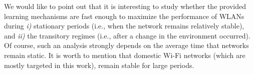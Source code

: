 \documentclass[a4paper,twoside,11pt]{reviewresponse}
\begin{document}
	We would like to point out that it is interesting to study whether the provided learning mechanisms are fast enough to maximize the performance of WLANs during \emph{i)} stationary periods (i.e., when the network remains relatively stable), and \emph{ii)} the transitory regimes (i.e., after a change in the environment occurred). Of course, such an analysis strongly depends on the average time that networks remain static. It is worth to mention that domestic Wi-Fi networks (which are mostly targeted in this work), remain stable for large periods.
	
	\clearpage
	
	
	
	
\end{document}

